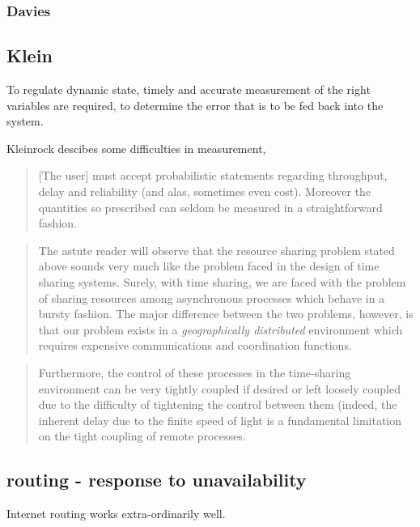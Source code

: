 \subsubsection{Davies}




\subsection{Klein}

To regulate dynamic state, timely and accurate measurement of the right variables are required, to
determine the error that is to be fed back into the system.

Kleinrock descibes some difficulties in measurement\cite{kleinrock1978},

\begin{quote}
    [The user] must accept probabilistic statements regarding throughput, delay and reliability (and
    alas, sometimes even cost). Moreover the quantities so prescribed can seldom be measured in a
    straightforward fashion.
\end{quote}

\begin{quote}
    The astute reader will observe that the resource sharing problem stated above sounds very much
    like the problem faced in the design of time sharing systems. Surely, with time sharing, we are
    faced with the problem of sharing resources among asynchronous processes which behave in a
    bursty fashion. The major difference between the two problems, however, is that our problem
    exists in a \emph{geographically distributed} environment which requires expensive
    communications and coordination functions.
\end{quote}

\begin{quote}
    Furthermore, the control of these processes in the time-sharing environment can be very tightly
    coupled if desired or left loosely coupled due to the difficulty of tightening the control
    between them (indeed, the inherent delay due to the finite speed of light is a fundamental
    limitation on the tight coupling of remote processes.
\end{quote}

\subsection{routing - response to unavailability}

Internet routing works extra-ordinarily well.

